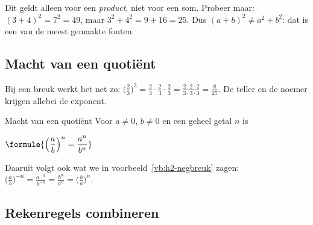 
Dit geldt alleen voor een \textit{product}, niet voor een som. Probeer maar: $(3 + 4)^2 = 7^2 = 49$, maar $3^2 + 4^2 = 9 + 16 = 25$. Dus $(a + b)^2 \neq a^2 + b^2$: dat is een van de meest gemaakte fouten.

\subsection{Macht van een quotiënt}

Bij een breuk werkt het net zo: $\bigl(\tfrac23\bigr)^3 = \tfrac23 \cdot \tfrac23 \cdot \tfrac23 = \tfrac{2 \cdot 2 \cdot 2}{3 \cdot 3 \cdot 3} = \tfrac{8}{27}$. De teller en de noemer krijgen allebei de exponent.

\begin{theorie}
\begin{stelling}{Macht van een quotiënt}
Voor $a \neq 0$, $b \neq 0$ en een geheel getal $n$ is

\vspace{1mm}
\qquad $\formule{\Bigl(\dfrac ab\Bigr)^n = \dfrac{a^n}{b^n}}$
\end{stelling}
\end{theorie}

Daaruit volgt ook wat we in voorbeeld~\ref{vb:h2-negbreuk} zagen: $\bigl(\tfrac ab\bigr)^{-n} = \tfrac{a^{-n}}{b^{-n}} = \tfrac{b^n}{a^n} = \bigl(\tfrac ba\bigr)^n$.


\begin{oefeningen}
\end{oefeningen}

\subsection{Rekenregels combineren}

